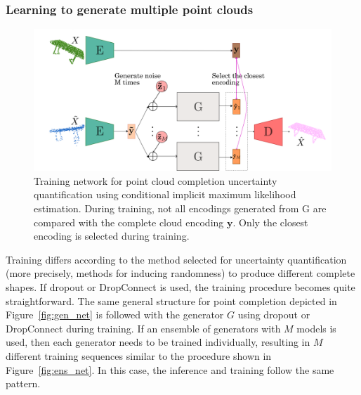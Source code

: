         \subsubsection{Learning to generate multiple point clouds}
        \begin{figure}[htb]
          \begin{center}
          \includegraphics[width=\linewidth]{figures/implicit_gen_network_imle.png}
          \end{center}
          \caption{Training network for point cloud completion uncertainty quantification using conditional implicit maximum likelihood estimation. During training, not all encodings generated from G are compared with the complete cloud encoding $\mathbf{y}$. Only the closest encoding is selected during training.}\label{fig:imle}
        \end{figure}
        Training differs according to the method selected for uncertainty quantification (more precisely, methods for inducing randomness) to produce different complete shapes. If dropout or DropConnect is used, the training procedure becomes quite straightforward. The same general structure for point completion depicted in Figure~\ref{fig:gen_net} is followed with the generator $G$ using dropout or DropConnect during training. If an ensemble of generators with $M$ models is used, then each generator needs to be trained individually, resulting in $M$ different training sequences similar to the procedure shown in Figure~\ref{fig:ens_net}. In this case, the inference and training follow the same pattern. 
        \newline
        
